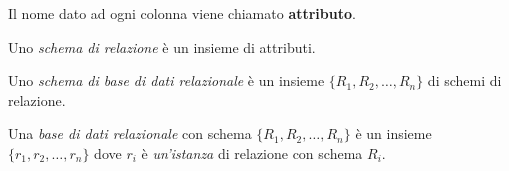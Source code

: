 Il nome dato ad ogni colonna viene chiamato \textbf{attributo}.
\begin{defn}
 Uno \emph{schema di relazione} è un insieme di attributi. 
\end{defn}
\begin{defn}
 Uno \emph{schema di base di dati relazionale} è un insieme $\{R_1, R_2, \ldots, R_n\}$ di 
 schemi di relazione. 
\end{defn}
\begin{defn}
 Una \emph{base di dati relazionale} con schema $\{R_1, R_2, \ldots, R_n\}$ è un insieme
 $\{r_1, r_2, \ldots, r_n\}$ dove $r_i$ è \emph{un'istanza} di relazione con schema $R_i$.
\end{defn}

